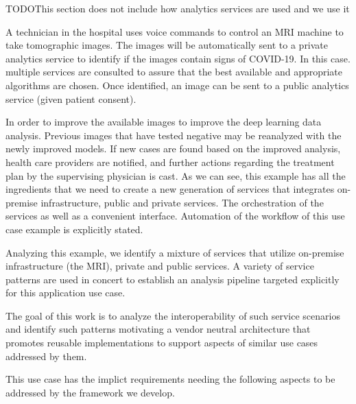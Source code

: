 TODO{This section does not include how analytics services are used and we use it}

A technician in the hospital uses voice commands to control an MRI
machine to take tomographic images. The images will be automatically
sent to a private analytics service to identify if the images contain
signs of COVID-19. In this case. multiple services are consulted to
assure that the best available and appropriate algorithms are chosen.
Once identified, an image can be sent to a public analytics service
(given patient consent).


In order to improve the available images to improve the deep learning
data analysis. Previous images that have tested negative may be
reanalyzed with the newly improved models. If new cases are found
based on the improved analysis, health care providers are notified,
and further actions regarding the treatment plan by the supervising
physician is cast. As we can see, this example has all the ingredients
that we need to create a new generation of services that integrates
on-premise infrastructure, public and private services. The
orchestration of the services as well as a convenient
interface. Automation of the workflow of this use case example is
explicitly stated.

Analyzing this example, we identify a mixture of services that utilize
on-premise infrastructure (the MRI), private and public services. A
variety of service patterns are used in concert to establish an analysis
pipeline targeted explicitly for this application use case. 

The goal of this work is to analyze the interoperability of such
service scenarios and identify such patterns motivating a vendor
neutral architecture that promotes reusable implementations to 
support aspects of similar use cases addressed by them.


This use case has the implict requirements needing the following
aspects to be addressed by the framework we develop.

